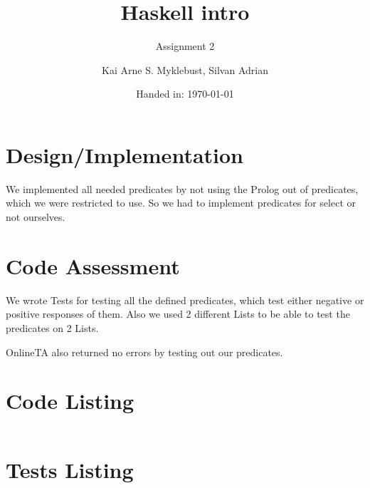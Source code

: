 \documentclass[12pt,a4paper]{article}
\begin{document}
\title{Haskell intro}
\subtitle{Assignment 2}

\author{Kai Arne S. Myklebust, Silvan Adrian}
\date{Handed in: \today}
	
\maketitle
\tableofcontents

\section{Design/Implementation}

We implemented all needed predicates by not using the Prolog out of predicates, which we were restricted to use.
So we had to implement predicates for select or not ourselves.

\section{Code Assessment}
We wrote Tests for testing all the defined predicates, which test either negative or positive responses of them.
Also we used 2 different Lists to be able to test the predicates on 2 Lists.

OnlineTA also returned no errors by testing out our predicates.

\appendix
\section{Code Listing}

\inputminted{prolog}{handin/twitbook.pl}

\section{Tests Listing}

\inputminted{prolog}{handin/tests.pl}
\end{document}
